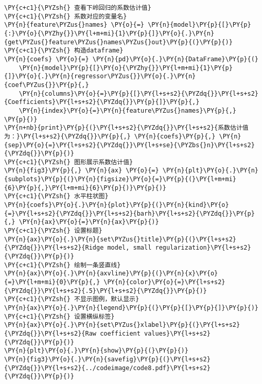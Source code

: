 \begin{Verbatim}[commandchars=\\\{\}]
\PY{c+c1}{\PYZsh{} 查看下岭回归的系数估计值}
\PY{c+c1}{\PYZsh{} 系数对应的变量名}
\PY{n}{feature\PYZus{}names} \PY{o}{=} \PY{n}{model}\PY{p}{[}\PY{p}{:}\PY{o}{\PYZhy{}}\PY{l+m+mi}{1}\PY{p}{]}\PY{o}{.}\PY{n}{get\PYZus{}feature\PYZus{}names\PYZus{}out}\PY{p}{(}\PY{p}{)}
\PY{c+c1}{\PYZsh{} 构造dataframe}
\PY{n}{coefs} \PY{o}{=} \PY{n}{pd}\PY{o}{.}\PY{n}{DataFrame}\PY{p}{(}
    \PY{n}{model}\PY{p}{[}\PY{o}{\PYZhy{}}\PY{l+m+mi}{1}\PY{p}{]}\PY{o}{.}\PY{n}{regressor\PYZus{}}\PY{o}{.}\PY{n}{coef\PYZus{}}\PY{p}{,}
    \PY{n}{columns}\PY{o}{=}\PY{p}{[}\PY{l+s+s2}{\PYZdq{}}\PY{l+s+s2}{Coefficients}\PY{l+s+s2}{\PYZdq{}}\PY{p}{]}\PY{p}{,}
    \PY{n}{index}\PY{o}{=}\PY{n}{feature\PYZus{}names}\PY{p}{,}
\PY{p}{)}
\PY{n+nb}{print}\PY{p}{(}\PY{l+s+s2}{\PYZdq{}}\PY{l+s+s2}{系数估计值为：}\PY{l+s+s2}{\PYZdq{}}\PY{p}{,} \PY{n}{coefs}\PY{p}{,} \PY{n}{sep}\PY{o}{=}\PY{l+s+s2}{\PYZdq{}}\PY{l+s+se}{\PYZbs{}n}\PY{l+s+s2}{\PYZdq{}}\PY{p}{)}
\PY{c+c1}{\PYZsh{} 图形展示系数估计值}
\PY{n}{fig3}\PY{p}{,} \PY{n}{ax} \PY{o}{=} \PY{n}{plt}\PY{o}{.}\PY{n}{subplots}\PY{p}{(}\PY{n}{figsize}\PY{o}{=}\PY{p}{(}\PY{l+m+mi}{6}\PY{p}{,}\PY{l+m+mi}{6}\PY{p}{)}\PY{p}{)}
\PY{c+c1}{\PYZsh{} 水平柱状图}
\PY{n}{coefs}\PY{o}{.}\PY{n}{plot}\PY{p}{(}\PY{n}{kind}\PY{o}{=}\PY{l+s+s2}{\PYZdq{}}\PY{l+s+s2}{barh}\PY{l+s+s2}{\PYZdq{}}\PY{p}{,} \PY{n}{ax}\PY{o}{=}\PY{n}{ax}\PY{p}{)}
\PY{c+c1}{\PYZsh{} 设置标题}
\PY{n}{ax}\PY{o}{.}\PY{n}{set\PYZus{}title}\PY{p}{(}\PY{l+s+s2}{\PYZdq{}}\PY{l+s+s2}{Ridge model, small regularization}\PY{l+s+s2}{\PYZdq{}}\PY{p}{)}
\PY{c+c1}{\PYZsh{} 绘制一条竖直线}
\PY{n}{ax}\PY{o}{.}\PY{n}{axvline}\PY{p}{(}\PY{n}{x}\PY{o}{=}\PY{l+m+mi}{0}\PY{p}{,} \PY{n}{color}\PY{o}{=}\PY{l+s+s2}{\PYZdq{}}\PY{l+s+s2}{.5}\PY{l+s+s2}{\PYZdq{}}\PY{p}{)}
\PY{c+c1}{\PYZsh{} 不显示图例，默认显示}
\PY{n}{ax}\PY{o}{.}\PY{n}{legend}\PY{p}{(}\PY{p}{[}\PY{p}{]}\PY{p}{)}
\PY{c+c1}{\PYZsh{} 设置横纵标签}
\PY{n}{ax}\PY{o}{.}\PY{n}{set\PYZus{}xlabel}\PY{p}{(}\PY{l+s+s2}{\PYZdq{}}\PY{l+s+s2}{Raw coefficient values}\PY{l+s+s2}{\PYZdq{}}\PY{p}{)}
\PY{n}{plt}\PY{o}{.}\PY{n}{show}\PY{p}{(}\PY{p}{)}
\PY{n}{fig3}\PY{o}{.}\PY{n}{savefig}\PY{p}{(}\PY{l+s+s2}{\PYZdq{}}\PY{l+s+s2}{../codeimage/code8.pdf}\PY{l+s+s2}{\PYZdq{}}\PY{p}{)}
\end{Verbatim}

